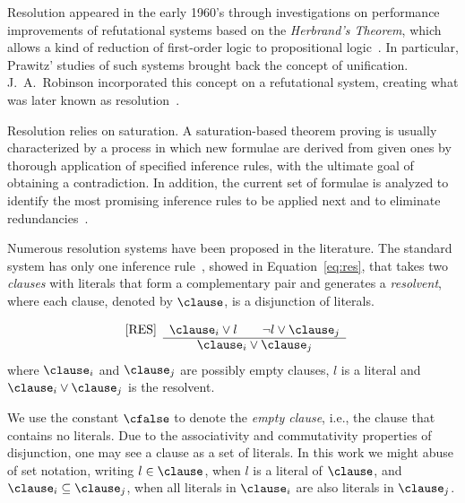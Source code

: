 Resolution appeared in the early 1960's through investigations on performance
improvements of refutational systems based on the \emph{Herbrand's Theorem}, which
allows a kind of reduction of first-order logic to propositional
logic~\cite{casanova}. In particular, Prawitz' studies of such systems brought
back the concept of unification. J.\ A.\ Robinson incorporated this concept on a
refutational system, creating what was later known as
resolution~\cite{Robinson65}. 

Resolution relies on saturation. A saturation-based theorem proving is usually
characterized by a process in which new formulae are derived from given
ones by thorough application of specified inference rules, with the ultimate
goal of obtaining a contradiction. In addition, the current set of formulae is
analyzed to identify the most promising inference rules to be applied next and
to eliminate redundancies~\cite{bachmair2001resolution}.

Numerous resolution systems have been proposed in the literature. The standard
system has only one inference rule~\cite{bachmair2001resolution}, showed in
Equation~\ref{eq:res}, that takes two \emph{clauses} with literals that form a
complementary pair and generates a \emph{resolvent}, where each clause, denoted
by $\clause$, is a disjunction of literals. 

\begin{equation}
\label{eq:res}
 \begin{array}{lc}
     \mbox{[RES]} & \clause_i \lor l \qquad \neg l \lor \clause_j\\  \cline{2-2}
     & \clause_i \lor \clause_j
\end{array}
\end{equation}
where $\clause_i$ and $\clause_j$ are possibly empty clauses, $l$ is a literal
and $\clause_i \lor \clause_j$ is the resolvent.

We use the constant $\cfalse$ to denote the \emph{empty clause},
i.e., the clause that contains no literals. Due to the associativity and
commutativity properties of disjunction, one may see a clause as a set of
literals. In this work we might abuse of set notation, writing $l \in \clause$,
when $l$ is a literal of $\clause$, and $\clause_i \subseteq \clause_j$, when
all literals in $\clause_i$ are also literals in $\clause_j$.

